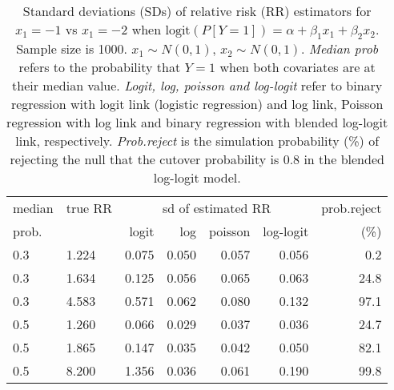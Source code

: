 \documentclass[12pt,a4paper]{article}
\begin{document}
\begin{table}[H] 
\small\sf\centering 
\caption{Standard deviations (SDs) of relative risk (RR) estimators for $x_1=-1$ vs $x_1=-2$ when $\mbox{logit}(P[Y=1])=\alpha+\beta_1 x_1 + \beta_2 x_2$. Sample size is 1000. $x_1 \sim $$N(0,1)$, $x_2 \sim N(0,1)$. {\it Median prob} refers to the probability that $Y=1$ when both covariates are at their median value. {\it Logit, log, poisson and log-logit} refer to binary regression with logit link (logistic regression) and log link, Poisson regression with log link and binary regression with blended log-logit link, respectively. {\it Prob.reject} is the simulation probability (\%) of rejecting the null that the cutover probability is $0.8$ in the blended log-logit model.} 
\begin{tabular}{llrrrrr} 
\toprule 
median & true RR & \multicolumn{4}{c}{sd of estimated RR} & prob.reject \\ 
prob. & & logit & log & poisson & log-logit  & (\%) \\ \midrule 
0.3 & 1.224 & 0.075 & 0.050 & 0.057 & 0.056 &  0.2 \\  
0.3 & 1.634 & 0.125 & 0.056 & 0.065 & 0.063 & 24.8 \\  
0.3 & 4.583 & 0.571 & 0.062 & 0.080 & 0.132 & 97.1 \\  
0.5 & 1.260 & 0.066 & 0.029 & 0.037 & 0.036 & 24.7 \\  
0.5 & 1.865 & 0.147 & 0.035 & 0.042 & 0.050 & 82.1 \\  
0.5 & 8.200 & 1.356 & 0.036 & 0.061 & 0.190 & 99.8 \\  
\bottomrule 
\end{tabular} 
\end{table} 
\end{document}
